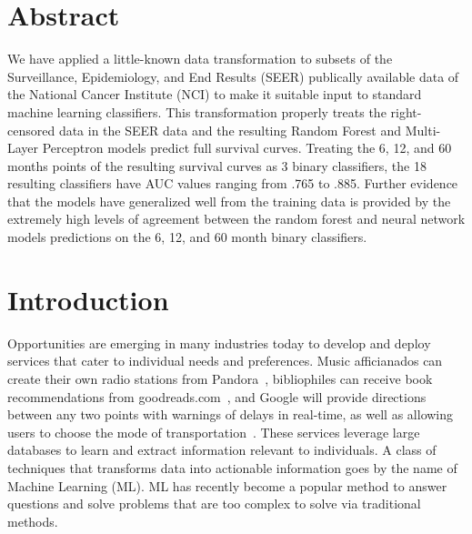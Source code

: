 \documentclass[10pt,letterpaper]{article}
\begin{document}
\section*{Abstract}
We have applied a little-known data transformation to subsets of the Surveillance, 
Epidemiology, and End Results (SEER) publically available data of the National Cancer 
Institute (NCI) to make it suitable input to standard machine learning classifiers. This transformation properly treats the right-censored data in the SEER data and the resulting Random Forest and Multi-Layer Perceptron models predict full survival curves. Treating the 6, 12, and 60 months points of the resulting survival curves as 3 binary classifiers, the 18 resulting classifiers have AUC values ranging from  .765 to .885. Further evidence that the models have generalized well from the training data is provided by the extremely high levels of agreement between the random forest and neural network models predictions on the 6, 12, and 60 month binary classifiers.



\linenumbers

\section{Introduction}
\label{sec:introduction}



Opportunities are emerging in many industries today to develop and deploy services that cater to individual needs and preferences. Music afficianados can create their own radio stations from Pandora~\cite{pandora}, bibliophiles can receive 
book recommendations from goodreads.com~\cite{goodreads}, and Google will provide directions between any two points with warnings of delays in real-time, as well as allowing users to choose the mode of transportation~\cite{maps}.
These services leverage large databases to learn and extract information relevant to individuals.  
A class of techniques that transforms data into actionable information goes by the name of Machine Learning (ML)\cite{pythonmachinelearning}.
ML has recently become a popular method to answer questions and solve problems that are too complex to solve via traditional methods. 
\end{document}
